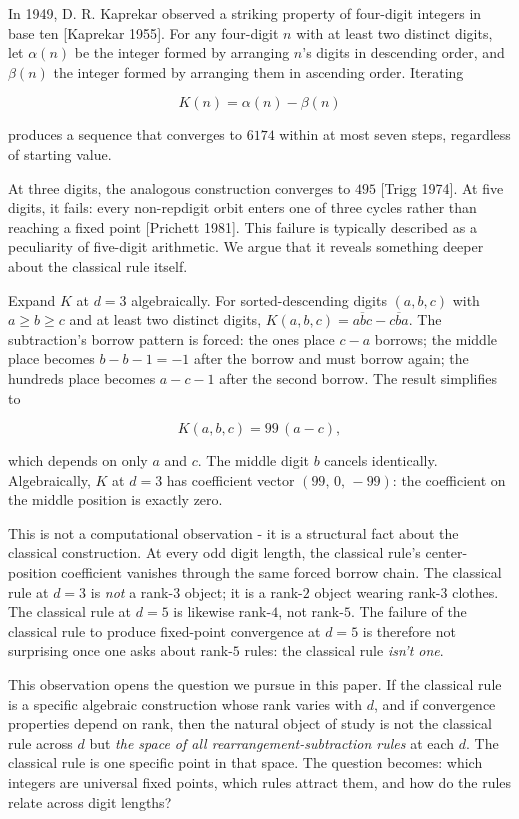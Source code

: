 \documentclass[11pt,letterpaper]{article}
\theoremstyle{paperstyle}
\theoremstyle{paperstyledef}
\theoremstyle{paperstylerem}
\begin{document}
In 1949, D. R. Kaprekar observed a striking property of four-digit
integers in base ten {[}Kaprekar 1955{]}. For any four-digit \(n\) with
at least two distinct digits, let \(\alpha(n)\) be the integer formed by
arranging \(n\)'s digits in descending order, and \(\beta(n)\) the
integer formed by arranging them in ascending order. Iterating

\[K(n) = \alpha(n) - \beta(n)\]

produces a sequence that converges to \(6174\) within at most seven
steps, regardless of starting value.

At three digits, the analogous construction converges to \(495\)
{[}Trigg 1974{]}. At five digits, it fails: every non-repdigit orbit
enters one of three cycles rather than reaching a fixed point
{[}Prichett 1981{]}. This failure is typically described as a
peculiarity of five-digit arithmetic. We argue that it reveals something
deeper about the classical rule itself.

Expand \(K\) at \(d = 3\) algebraically. For sorted-descending digits
\((a, b, c)\) with \(a \geq b \geq c\) and at least two distinct digits,
\(K(a, b, c) = \overline{abc} - \overline{cba}\). The subtraction's
borrow pattern is forced: the ones place \(c - a\) borrows; the middle
place becomes \(b - b - 1 = -1\) after the borrow and must borrow again;
the hundreds place becomes \(a - c - 1\) after the second borrow. The
result simplifies to

\[K(a, b, c) = 99 \, (a - c),\]

which depends on only \(a\) and \(c\). The middle digit \(b\) cancels
identically. Algebraically, \(K\) at \(d = 3\) has coefficient vector
\((99, \, 0, \, -99)\): the coefficient on the middle position is
exactly zero.

This is not a computational observation - it is a structural fact
about the classical construction. At every odd digit length, the
classical rule's center-position coefficient vanishes through the same
forced borrow chain. The classical rule at \(d = 3\) is \emph{not} a
rank-\(3\) object; it is a rank-\(2\) object wearing rank-\(3\) clothes.
The classical rule at \(d = 5\) is likewise rank-\(4\), not rank-\(5\).
The failure of the classical rule to produce fixed-point convergence at
\(d = 5\) is therefore not surprising once one asks about rank-\(5\)
rules: the classical rule \emph{isn't one}.

This observation opens the question we pursue in this paper. If the
classical rule is a specific algebraic construction whose rank varies
with \(d\), and if convergence properties depend on rank, then the
natural object of study is not the classical rule across \(d\) but
\emph{the space of all rearrangement-subtraction rules} at each \(d\).
The classical rule is one specific point in that space. The question
becomes: which integers are universal fixed points, which rules attract
them, and how do the rules relate across digit lengths?
\end{document}
